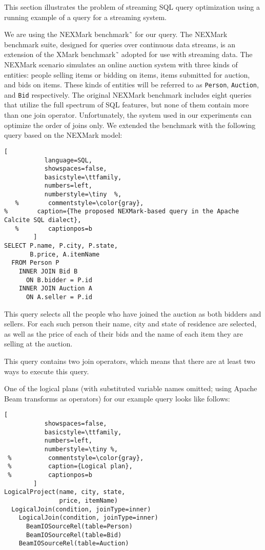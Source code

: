\label {sec:fs-optimization-problem-statement}

This section illustrates the problem of streaming SQL query optimization using a running example of a query for a streaming system.

We are using the NEXMark benchmark˜\cite{tucker2008nexmark} for our query. The NEXMark benchmark suite, designed for queries over continuous data streams, is an extension of the XMark benchmark˜\cite{schmidt2002xmark} adopted for use with streaming data. 
The NEXMark scenario simulates an online auction system with three kinds of entities: people selling items or bidding on items, items submitted for auction, and bids on items. 
These kinds of entities will be referred to as \texttt{Person}, \texttt{Auction}, and \texttt{Bid} respectively. 
The original NEXMark benchmark includes eight queries that utilize the full spectrum of SQL features, but none of them contain more than one join operator.  Unfortunately, the system used in our experiments can optimize the order of joins only. 
We extended the benchmark with  the following query based on the NEXMark model:  



\begin{lstlisting}[
           language=SQL,
           showspaces=false,
           basicstyle=\ttfamily,
           numbers=left,
           numberstyle=\tiny  %,
   %        commentstyle=\color{gray},
%        caption={The proposed NEXMark-based query in the Apache Calcite SQL dialect}, 
   %        captionpos=b
        ]
SELECT P.name, P.city, P.state, 
       B.price, A.itemName 
  FROM Person P 
    INNER JOIN Bid B 
      ON B.bidder = P.id 
    INNER JOIN Auction A 
      ON A.seller = P.id
\end{lstlisting}

This query selects all the people who have joined the auction as both bidders and sellers. 
For each such person their name, city and state of residence are selected, as well as the price of each of their bids and the name of each item they are selling at the auction. 

This query contains two join operators, which means that there are at least two ways to execute this query.

One of the logical   plans (with substituted variable names omitted; using Apache Beam transforms as operators) for our example query looks like  follows: 

\begin{lstlisting}[
           showspaces=false,
           basicstyle=\ttfamily,
           numbers=left,
           numberstyle=\tiny %,
 %          commentstyle=\color{gray},
 %          caption={Logical plan}, 
 %          captionpos=b
        ]
LogicalProject(name, city, state, 
               price, itemName)
  LogicalJoin(condition, joinType=inner) 
    LogicalJoin(condition, joinType=inner)
      BeamIOSourceRel(table=Person)
      BeamIOSourceRel(table=Bid)
    BeamIOSourceRel(table=Auction)
\end{lstlisting}

